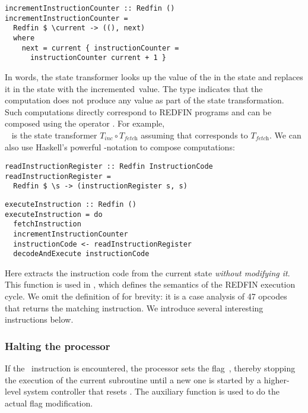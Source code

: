 \begin{verbatim}
incrementInstructionCounter :: Redfin ()
incrementInstructionCounter =
  Redfin $ \current -> ((), next)
  where
    next = current { instructionCounter =
      instructionCounter current + 1 }
\end{verbatim}


\noindent
In words, the state transformer looks up the value of the 
in the  state and replaces it in the  state with the
incremented~value. The type  indicates that the computation does not
produce any value as part of the state transformation. Such computations directly
correspond to REDFIN programs and can be composed using the operator \hs{>>}.
For example, \\\hs{>>}~ is
the state transformer $T_\textit{inc} \circ T_\textit{fetch}$ assuming that
 corresponds to $T_\textit{fetch}$. We can also use
Haskell's powerful -notation to compose computations:


\begin{verbatim}
readInstructionRegister :: Redfin InstructionCode
readInstructionRegister =
  Redfin $ \s -> (instructionRegister s, s)
\end{verbatim}

\begin{verbatim}
executeInstruction :: Redfin ()
executeInstruction = do
  fetchInstruction
  incrementInstructionCounter
  instructionCode <- readInstructionRegister
  decodeAndExecute instructionCode
\end{verbatim}

\noindent
Here  extracts the instruction code from the current
state \emph{without modifying it}. This function is used in ,
which defines the semantics of the REDFIN execution cycle. We omit the definition of
 for brevity: it is a case analysis of 47 opcodes that returns
the matching instruction. We introduce several interesting instructions below.


\subsubsection{Halting the processor}
If the~ instruction is encountered, the processor sets the flag~,
thereby stopping the execution of the current subroutine until a new one is
started by a higher-level system controller that resets . The auxiliary
function  is used to do the actual flag modification.


